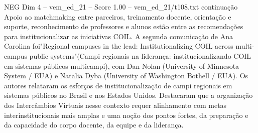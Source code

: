 \begin{textsample}{NEG Dim 4 – vem\_ed\_21 – Score 1.00 – vem\_ed\_21/t108.txt}  \label{ex:f4_neg_069}
continuação Apoio ao matchmaking entre parceiros, treinamento docente, orientação e suporte, reconhecimento de professores e alunos estão entre as recomendações para institucionalizar as iniciativas COIL.
A segunda comunicação de Ana Carolina foi"Regional campuses in the lead: Institutionalizing COIL across multi-campus public systems"(Campi regionais na liderança: institucionalizando COIL em sistemas públicos multicampi), com Dan Nolan (University of Minnesota System / EUA) e Natalia Dyba (University of Washington Bothell / EUA).
Os autores relataram os esforços de institucionalização de campi regionais em sistemas públicos no Brasil e nos Estados Unidos.
Destacaram que a organização dos Intercâmbios Virtuais nesse contexto requer alinhamento com metas interinstitucionais mais amplas e uma noção dos pontos fortes, da preparação e da capacidade do corpo docente, da equipe e da liderança.

\end{textsample}
